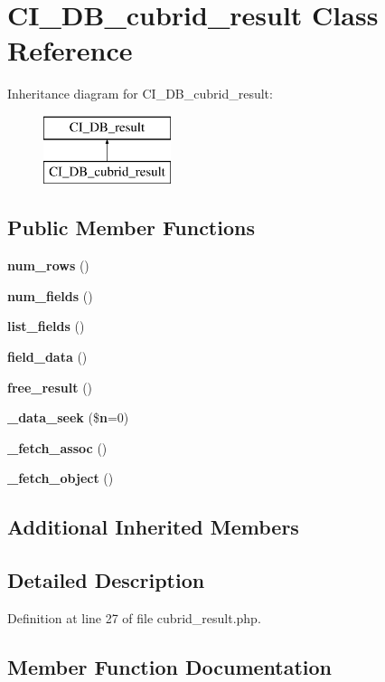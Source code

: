 \section{C\-I\-\_\-\-D\-B\-\_\-cubrid\-\_\-result Class Reference}
\label{class_c_i___d_b__cubrid__result}
Inheritance diagram for C\-I\-\_\-\-D\-B\-\_\-cubrid\-\_\-result\-:\begin{figure}[H]
\begin{center}
\leavevmode
\includegraphics[height=2.000000cm]{class_c_i___d_b__cubrid__result}
\end{center}
\end{figure}
\subsection*{Public Member Functions}
\begin{DoxyCompactItemize}
\item 
{\bf num\-\_\-rows} ()
\item 
{\bf num\-\_\-fields} ()
\item 
{\bf list\-\_\-fields} ()
\item 
{\bf field\-\_\-data} ()
\item 
{\bf free\-\_\-result} ()
\item 
{\bf \-\_\-data\-\_\-seek} (\${\bf n}=0)
\item 
{\bf \-\_\-fetch\-\_\-assoc} ()
\item 
{\bf \-\_\-fetch\-\_\-object} ()
\end{DoxyCompactItemize}
\subsection*{Additional Inherited Members}


\subsection{Detailed Description}


Definition at line 27 of file cubrid\-\_\-result.\-php.



\subsection{Member Function Documentation}
